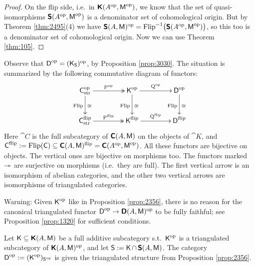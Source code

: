 \begin{proof}
On the flip side, i.e.\ in 
$\boldsymbol{\mathsf{K}}(A^{\mathrm{op}}, \operatorname{\mathsf{M}}^{\mathrm{op}})$,
we know that the set of quasi-iso\-morphisms
$\boldsymbol{\mathsf{S}}(A^{\mathrm{op}}, \operatorname{\mathsf{M}}^{\mathrm{op}})$
is a denominator set of cohomological origin. But
by Theorem \ref{thm:2495}(4) we have 
$\boldsymbol{\mathsf{S}}(A, \operatorname{\mathsf{M}})^{\mathrm{op}} = 
\operatorname{Flip}^{-1} \bigl( \boldsymbol{\mathsf{S}}(A^{\mathrm{op}}, \operatorname{\mathsf{M}}^{\mathrm{op}}) \bigr)$,
so this too is a denominator set of cohomological origin. 
Now we can use Theorem \ref{thm:105}. 
\end{proof}


Observe that 
$\operatorname{\mathsf{D}}^{\mathrm{op}} = (\operatorname{\mathsf{K}}_{\operatorname{\mathsf{S}}})^{\mathrm{op}}$,
by Proposition \ref{prop:3030}. 
The situation is summarized by the following commutative diagram of functors:
\begin{equation} \label{eqn:3060}
\UseTips \xymatrix @C=10ex @R=6ex {
\cat{C}_{\mrm{str}}^{\mrm{op}}
\ar@{->>}[r]^{\opn{P}^{\mrm{op}}}
\ar[d]_{\opn{Flip}}^{\cong}
&
\cat{K}^{\mrm{op}}
\ar[r]^{\opn{Q}^{\mrm{op}}}
\ar[d]_{\opn{Flip}}^{\cong}
&
\cat{D}^{\mrm{op}}
\ar[d]_{\opn{Flip}}^{\cong}
\\
\cat{C}_{\mrm{str}}^{\mrm{flip}}
\ar@{->>}[r]^{\opn{P}^{\mrm{flip}}}
&
\cat{K}^{\mrm{flip}}
\ar[r]^{\opn{Q}^{\mrm{flip}}}
&
\cat{D}^{\mrm{flip}} 
} 
\end{equation}
Here $\cat{C}$ is the full subcategory of 
$\boldsymbol{\mathsf{C}}(A, \operatorname{\mathsf{M}})$ on the objects of $\cat{K}$,
and 
$\operatorname{\mathsf{C}}^{\mathrm{flip}} := \operatorname{Flip}(\operatorname{\mathsf{C}}) \subseteq 
\boldsymbol{\mathsf{C}}(A, \operatorname{\mathsf{M}})^{\mathrm{flip}} = 
\boldsymbol{\mathsf{C}}(A^{\mathrm{op}}, \operatorname{\mathsf{M}}^{\mathrm{op}})$.
All these functors are bijective on objects. The vertical ones are bijective on 
morphisms too. The functors marked $\twoheadrightarrow$ are surjective on morphisms (i.e.\ 
they are full). The first vertical arrow is an isomorphism of abelian 
categories, and the other two vertical arrows are isomorphisms of triangulated 
categories.

Warning: Given $\operatorname{\mathsf{K}}^{\mathrm{op}}$ like in Proposition \ref{prop:2356}, 
there is no reason for the canonical triangulated functor 
$\operatorname{\mathsf{D}}^{\mathrm{op}} \to \boldsymbol{\mathsf{D}}(A, \operatorname{\mathsf{M}})^{\mathrm{op}}$
to be fully faithful; see Proposition \ref{prop:1320} for sufficient 
conditions. 


\begin{dfn} \label{dfn:3225}
Let $\operatorname{\mathsf{K}} \subseteq \boldsymbol{\mathsf{K}}(A, \operatorname{\mathsf{M}})$ be a full additive subcategory s.t.\ 
$\operatorname{\mathsf{K}}^{\mathrm{op}}$ is a  triangulated subcategory of 
$\boldsymbol{\mathsf{K}}(A, \operatorname{\mathsf{M}})^{\mathrm{op}}$, and let 
$\operatorname{\mathsf{S}} := \operatorname{\mathsf{K}} \cap \, \boldsymbol{\mathsf{S}}(A, \operatorname{\mathsf{M}})$.
The category 
$\operatorname{\mathsf{D}}^{\mathrm{op}} := (\operatorname{\mathsf{K}}^{\mathrm{op}})_{\operatorname{\mathsf{S}}^{\mathrm{op}}}$
is given the triangulated structure from Proposition \ref{prop:2356}. 
\index{Derived category! opposite}
\end{dfn}

